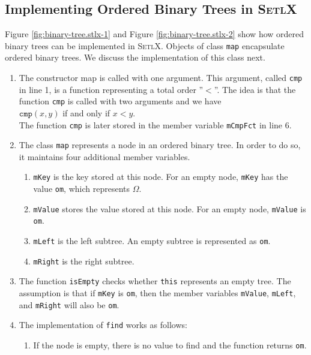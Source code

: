 \subsection{Implementing Ordered Binary Trees in \textsc{SetlX}}
Figure \ref{fig:binary-tree.stlx-1} and Figure \ref{fig:binary-tree.stlx-2} show how ordered binary
trees can be implemented in \textsc{SetlX}.  Objects of class \texttt{map} encapsulate ordered
binary trees.  We discuss the implementation of this class next.
\begin{enumerate}
\item The constructor map is called with one argument.  This argument, called \texttt{cmp}
      in line 1, is a function representing a total order ''$<$''.  The idea is that the function
      \texttt{cmp} is called with two arguments and we have
      \\[0.2cm]
      \hspace*{1.3cm}
      $\mathtt{cmp}(x,y)$ \quad if and only if \quad $x < y$.
      \\[0.2cm]
      The function \texttt{cmp} is later stored in the member variable \texttt{mCmpFct} in line 6.
\item The class \texttt{map} represents a node in an ordered binary tree.  In order to do so, it
      maintains four additional member variables.
      \begin{enumerate}
      \item \texttt{mKey} is the key stored at this node.  For an empty node, \texttt{mKey}
            has the value \texttt{om}, which represents $\Omega$.
      \item \texttt{mValue} stores the value stored at this node.  For an empty node,
            \texttt{mValue} is \texttt{om}.
      \item \texttt{mLeft} is the left subtree.  An empty subtree is represented as \texttt{om}.
      \item \texttt{mRight} is the right subtree.  
      \end{enumerate}
\item The function \texttt{isEmpty} checks whether \texttt{this} represents an empty tree.
      The assumption is that if \texttt{mKey} is \texttt{om}, then the member variables
      \texttt{mValue}, \texttt{mLeft}, and \texttt{mRight} will also be \texttt{om}.
\item The implementation of \texttt{find} works as follows:
      \begin{enumerate}
      \item If the node is empty, there is no value to find and the function returns \texttt{om}.

\end{enumerate}
\end{enumerate}
